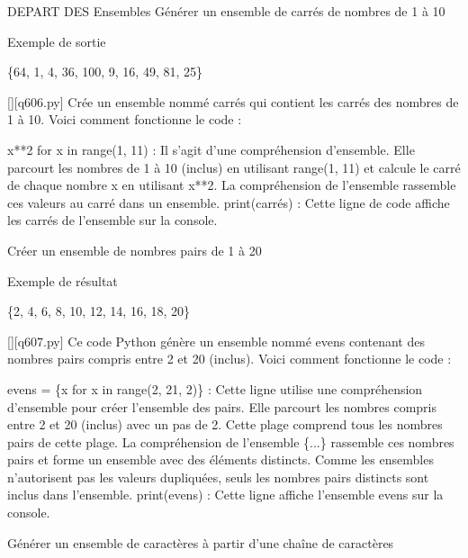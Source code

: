 \renewcommand{\chemincode}{../../code/}
       \question
        DEPART DES Ensembles
Générer un ensemble de carrés de nombres de 1 à 10

Exemple de sortie

\{64, 1, 4, 36, 100, 9, 16, 49, 81, 25\}
        \par
        \begin{solution}
            \renewcommand{\nomfichier}{q606.py}
            \pythonfile{\chemincode \nomfichier}[][\nomfichier]
            Crée un ensemble nommé carrés qui contient les carrés des nombres de 1 à 10. Voici comment fonctionne le code :

    {x**2 for x in range(1, 11)} : Il s'agit d'une compréhension d'ensemble. Elle parcourt les nombres de 1 à 10 (inclus) en utilisant range(1, 11) et calcule le carré de chaque nombre x en utilisant x**2. La compréhension de l'ensemble rassemble ces valeurs au carré dans un ensemble.
    print(carrés) : Cette ligne de code affiche les carrés de l'ensemble sur la console.
        \end{solution}
        

        \question
        Créer un ensemble de nombres pairs de 1 à 20

Exemple de résultat

\{2, 4, 6, 8, 10, 12, 14, 16, 18, 20\}
        \par
        \begin{solution}
            \renewcommand{\nomfichier}{q607.py}
            \pythonfile{\chemincode \nomfichier}[][\nomfichier]
            Ce code Python génère un ensemble nommé evens contenant des nombres pairs compris entre 2 et 20 (inclus). Voici comment fonctionne le code :

    evens = \{x for x in range(2, 21, 2)\} : Cette ligne utilise une compréhension d'ensemble pour créer l'ensemble des pairs. Elle parcourt les nombres compris entre 2 et 20 (inclus) avec un pas de 2. Cette plage comprend tous les nombres pairs de cette plage.
    La compréhension de l'ensemble \{...\} rassemble ces nombres pairs et forme un ensemble avec des éléments distincts. Comme les ensembles n'autorisent pas les valeurs dupliquées, seuls les nombres pairs distincts sont inclus dans l'ensemble.
    print(evens) : Cette ligne affiche l'ensemble evens sur la console.
        \end{solution}
        

        \question
        Générer un ensemble de caractères à partir d'une chaîne de caractères

